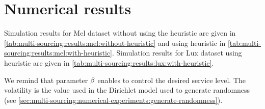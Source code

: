 \section{Numerical results}
\label{sec:multi-sourcing:numerical-experiments:numerical-results}




Simulation results for Mel dataset without using the heuristic are given in \cref{tab:multi-sourcing:results:mel:without-heuristic} and using heuristic in \cref{tab:multi-sourcing:results:mel:with-heuristic}.
Simulation results for Lux dataset using heuristic are given in \cref{tab:multi-sourcing:results:lux:with-heuristic}.


We remind that parameter $\beta$ enables to control the desired service level.
The volatility is the value used in the Dirichlet model used to generate randomness (see \cref{sec:multi-sourcing:numerical-experiments:generate-randomness}).


